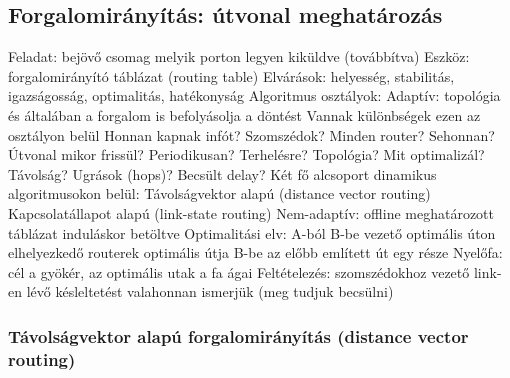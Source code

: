 \documentclass[12pt,a4paper]{article}
\begin{document}
\subsection{Forgalomirányítás: útvonal meghatározás}

\begin{outline}
	\1 Feladat: bejövő csomag melyik porton legyen kiküldve (továbbítva)
	\1 Eszköz: forgalomirányító táblázat (routing table)
	\1 Elvárások: helyesség, stabilitás, igazságosság, optimalitás, hatékonyság
	\1 Algoritmus osztályok:
		\2 Adaptív: topológia és általában a forgalom is befolyásolja a döntést
			\3 Vannak különbségek ezen az osztályon belül
			\3 Honnan kapnak infót? Szomszédok? Minden router? Sehonnan?
			\3 Útvonal mikor frissül? Periodikusan? Terhelésre? Topológia?
			\3 Mit optimalizál? Távolság? Ugrások (hops)? Becsült delay?
			\3 Két fő alcsoport dinamikus algoritmusokon belül:
				\4 Távolságvektor alapú (distance vector routing)
				\4 Kapcsolatállapot alapú (link-state routing)
		\2 Nem-adaptív: offline meghatározott táblázat induláskor betöltve
	\1 Optimalitási elv: A-ból B-be vezető optimális úton elhelyezkedő routerek optimális útja B-be az előbb említett út egy része
		\2 Nyelőfa: cél a gyökér, az optimális utak a fa ágai
	\1 Feltételezés: szomszédokhoz vezető link-en lévő késleltetést valahonnan ismerjük (meg tudjuk becsülni)
\end{outline}

\pagebreak

\subsubsection{Távolságvektor alapú forgalomirányítás (distance vector routing)}
\end{document}
